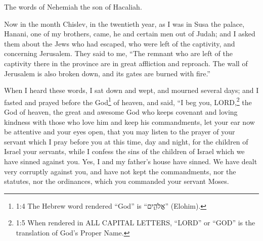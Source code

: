 \newpage
\null
\thispagestyle{empty}
\newpage







\vspace{-1.36in}

\mychapter{} \myverse*{}The words of Nehemiah the son of Hacaliah.

Now in the month Chislev, in the twentieth year, as I was in Susa the palace,
\myverse{}Hanani, one of my brothers, came, he and certain men out of Judah; and I asked
them about the Jews who had escaped, who were left of the captivity, and concerning Jerusalem.
\myverse{}They said to me, “The remnant who are left of the captivity there in the province
are in great affliction and reproach. The wall of Jerusalem is also broken down, and its gates are burned
with fire.”

\myverse{}When I heard these words, I sat down and wept, and mourned several
days; and I fasted and prayed before the God\footnote{1:4 The Hebrew word rendered “God” is “אֱלֹהִ֑ים” (Elohim).} of heaven,
\myverse{}and said, “I beg you, LORD,\footnote{1:5 When rendered in ALL CAPITAL LETTERS, “LORD” or “GOD” is the translation of God’s Proper Name.}
the God of heaven, the great and awesome God who keeps covenant and loving kindness with those who love
him and keep his commandments,
\myverse{}let your ear now be attentive and your eyes open, that you may listen to the
prayer of your servant which I pray before you at this time, day and night, for the children of Israel
your servants, while I confess the sins of the children of Israel which we have sinned against you. Yes,
I and my father’s house have sinned.
\myverse{}We have dealt very corruptly against you, and have not kept the commandments,
nor the statutes, nor the ordinances, which you commanded your servant Moses.


